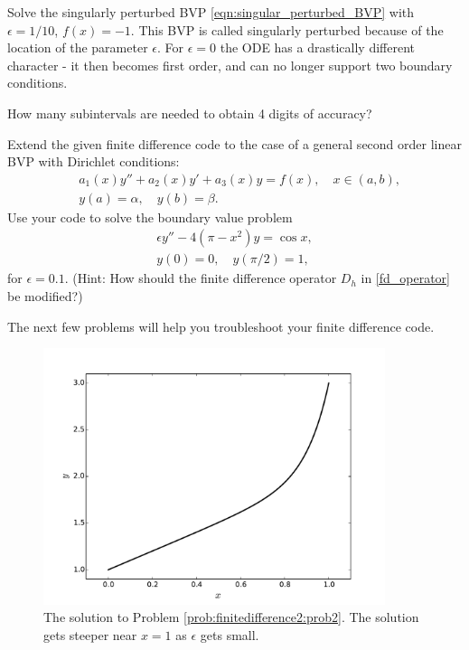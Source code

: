 \begin{problem}
Solve the singularly perturbed BVP \eqref{eqn:singular_perturbed_BVP} with $\epsilon = 1/10$, $f(x) = -1$.
This BVP is called singularly perturbed because of the location of the parameter $\epsilon$. 
For $\epsilon = 0$ the ODE has a drastically different character - it then becomes first order, and can no longer support two boundary conditions.
	
How many subintervals are needed to obtain 4 digits of accuracy?
	\label{prob:finitedifference2:prob2}
\end{problem}



\begin{problem}
Extend the given finite difference code to the case of a general second order linear BVP with Dirichlet conditions:
\begin{align*}
	&{ } a_1(x)y'' +a_2(x)y'+ a_3(x) y = f(x), \quad x \in (a,b),\\
	&{ } y(a) = \alpha, \quad y(b) = \beta.
\end{align*}
Use your code to solve the boundary value problem
\begin{align*}
	\epsilon y'' - 4(\pi - x^2)y = \cos x, \\
	y(0) = 0, \quad y(\pi/2) = 1,
\end{align*}
for $\epsilon = 0.1$.
\label{prob:finitedifference2:prob3}
(Hint: How should the finite difference operator $D_h$ in \eqref{fd_operator} be modified?) 

The next few problems will help you troubleshoot your finite difference code. 
\end{problem}

\begin{figure}[h]
\centering
\includegraphics[width=10cm]{figure2.pdf}
\caption{The solution to Problem \ref{prob:finitedifference2:prob2}.
The solution gets steeper near $x = 1$ as $\epsilon $ gets small.}
\end{figure}

